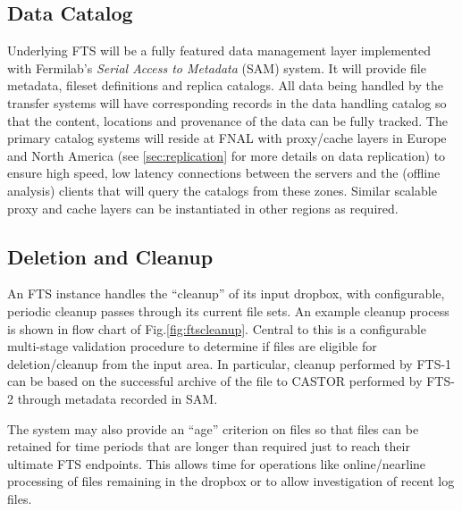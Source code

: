 \documentclass[12pt]{article}
\begin{document}
\subsection{Data Catalog}
\label{sec:sam}

Underlying FTS will be a fully featured data management layer
implemented with Fermilab's \textit{Serial Access to Metadata} (SAM) system.
It will provide file metadata, fileset definitions and replica
catalogs.  All data being handled by the transfer systems will have
corresponding records in the data handling catalog so that the
content, locations and provenance of the data can be fully tracked.
The primary catalog systems will reside at FNAL with proxy/cache
layers in Europe and North America (see \ref{sec:replication}
for more details on data replication) to ensure high speed,
low latency connections between the servers and the (offline analysis)
clients that will query the catalogs from these zones.  Similar
scalable proxy and cache layers can be instantiated in other regions as required.

\subsection{Deletion and Cleanup}
\label{sec:cleanup}

An FTS instance handles the ``cleanup'' of its input dropbox, with
configurable, periodic cleanup passes through its current file sets.
An example cleanup process is shown in flow chart of
Fig.\ref{fig:ftscleanup}.  Central to this is a configurable
multi-stage validation procedure to determine if files are eligible
for deletion/cleanup from the input area.  In particular, cleanup
performed by FTS-1 can be based on the successful archive of the file
to CASTOR performed by FTS-2 through metadata recorded in SAM.

The system may also provide an ``age'' criterion on files so that
files can be retained for time periods that are longer than required
just to reach their ultimate FTS endpoints.  This allows time for
operations like online/nearline processing of files remaining in the
dropbox or to allow investigation of recent log files.
\end{document}
